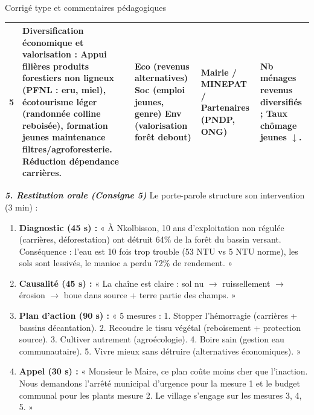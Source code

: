 \documentclass[11pt]{article}
\begin{document}
\begin{exoresolu}{Corrigé type et commentaires pédagogiques}
\begin{center}
\begin{tabularx}{\linewidth}{|c|X|X|X|X|}
5 & \textbf{Diversification économique et valorisation} : Appui filières produits forestiers non ligneux (PFNL : eru, miel), écotourisme léger (randonnée colline reboisée), formation jeunes maintenance filtres/agroforesterie. Réduction dépendance carrières. & \textbf{Eco} (revenus alternatives) \textbf{Soc} (emploi jeunes, genre) \textbf{Env} (valorisation forêt debout) & Mairie / MINEPAT / Partenaires (PNDP, ONG) & Nb ménages revenus diversifiés ; Taux chômage jeunes $\downarrow$. \\ \hline
\end{tabularx}
\end{center}

\emph{\textbf{5. Restitution orale (Consigne 5)}}
Le porte-parole structure son intervention (3 min) :
\begin{enumerate}
    \item \textbf{Diagnostic (45 s) :} « À Nkolbisson, 10 ans d'exploitation non régulée (carrières, déforestation) ont détruit 64\% de la forêt du bassin versant. Conséquence : l'eau est 10 fois trop trouble (53 NTU vs 5 NTU norme), les sols sont lessivés, le manioc a perdu 72\% de rendement. »
    \item \textbf{Causalité (45 s) :} « La chaîne est claire : sol nu $\rightarrow$ ruissellement $\rightarrow$ érosion $\rightarrow$ boue dans source + terre partie des champs. »
    \item \textbf{Plan d'action (90 s) :} « 5 mesures : 1. Stopper l'hémorragie (carrières + bassins décantation). 2. Recoudre le tissu végétal (reboisement + protection source). 3. Cultiver autrement (agroécologie). 4. Boire sain (gestion eau communautaire). 5. Vivre mieux sans détruire (alternatives économiques). »
    \item \textbf{Appel (30 s) :} « Monsieur le Maire, ce plan coûte moins cher que l'inaction. Nous demandons l'arrêté municipal d'urgence pour la mesure 1 et le budget communal pour les plants mesure 2. Le village s'engage sur les mesures 3, 4, 5. »
\end{enumerate}
\end{exoresolu}
\end{document}
